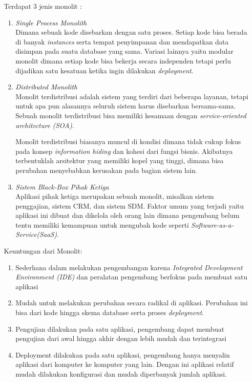 Terdapat 3 jenis monolit \cite{6}:
\begin{enumerate}[leftmargin=1.3cm]
\item \textit{Single Process Monolith}\\
Dimana sebuah kode disebarkan dengan satu proses. Setiap kode bisa berada di banyak \textit{instances} serta tempat penyimpanan dan mendapatkan data disimpan pada suatu database yang sama. Variasi lainnya yaitu modular monolit dimana setiap kode bisa bekerja secara independen tetapi perlu dijadikan satu kesatuan ketika ingin dilakukan \textit{deployment}.
\item \textit{Distributed Monolith}\\
Monolit terdistribusi adalah sistem yang terdiri dari beberapa layanan, tetapi untuk apa pun alasannya seluruh sistem harus disebarkan bersama-sama. Sebuah monolit terdistribusi bisa memiliki kesamaan dengan \textit{service-oriented architecture (SOA)}.

Monolit terdistribusi biasanya muncul  di kondisi dimana tidak cukup fokus pada konsep \textit{information hiding} dan kohesi dari fungsi bisnis. Akibatnya terbentuklah arsitektur yang memiliki kopel yang tinggi, dimana bisa perubahan menyebabkan kerusakan pada bagian sistem lain.
\item \textit{Sistem Black-Box Pihak Ketiga}\\
Aplikasi pihak ketiga merupakan sebuah monolit, misalkan sistem penggajian, sistem CRM, dan sistem SDM. Faktor umum yang terjadi yaitu aplikasi ini dibuat dan dikelola oleh orang lain dimana pengembang belum tentu memiliki kemampuan untuk mengubah kode seperti \textit{Software-as-a-Service(SaaS)}.
\end{enumerate}

Keuntungan dari Monolit:
\begin{enumerate}[leftmargin=1.3cm]
\item Sederhana dalam melakukan pengembangan karena \textit{Integrated Development Environment (IDE)} dan peralatan pengembang berfokus pada membuat satu aplikasi
\item Mudah untuk melakukan perubahan secara radikal di aplikasi. Perubahan ini bisa dari kode hingga skema database serta proses \textit{deployment}.
\item Pengujian dilakukan pada satu aplikasi, pengembang dapat membuat pengujian dari awal hingga akhir dengan lebih mudah dan terintegrasi
\item Deployment dilakukan pada satu aplikasi, pengembang hanya menyalin aplikasi dari komputer ke komputer yang lain. Dengan ini aplikasi relatif mudah dilakukan konfigurasi dan mudah diperbanyak jumlah aplikasi.
\end{enumerate}


